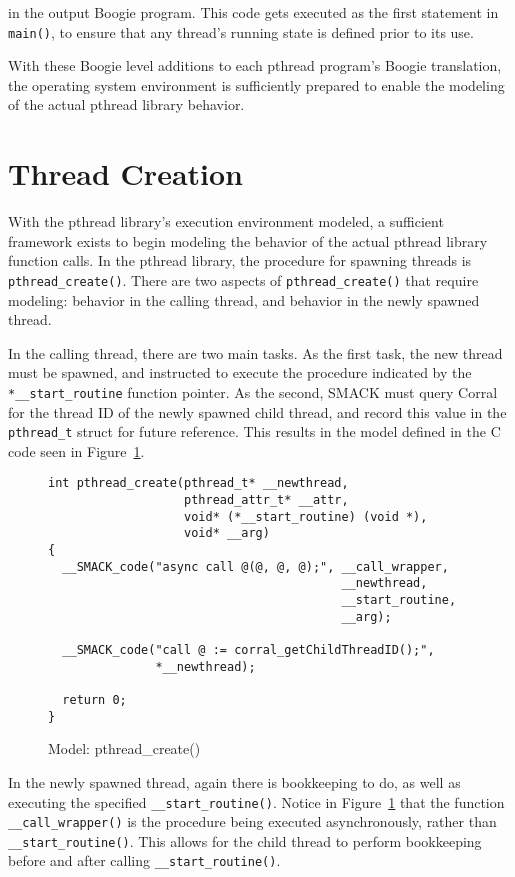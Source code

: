 \noindent in the output Boogie program.  This code gets executed as
the first statement in \lstinline|main()|, to ensure that any thread's
running state is defined prior to its use. 

With these Boogie level additions to each pthread program's Boogie
translation, the operating system environment is sufficiently prepared
to enable the modeling of the actual pthread library behavior.


\section{Thread Creation}
With the pthread library's execution environment modeled, a sufficient
framework exists to begin modeling the behavior of the actual pthread
library function calls.  In the pthread library, the procedure for
spawning threads is \lstinline|pthread_create()|.  There are two
aspects of \lstinline|pthread_create()| that require modeling:
behavior in the calling thread, and behavior in the newly spawned
thread. 

In the calling thread, there are two main tasks.  As the first task,
the new thread must be spawned, and instructed to execute the
procedure indicated by the \lstinline|*__start_routine| function
pointer.  As the second, SMACK must query Corral for the thread ID of
the newly spawned child thread, and record this value in the
\lstinline|pthread_t| struct for future reference.  This results in
the model defined in the C code seen in Figure~\ref{fig:pthread_create}.

\begin{figure}[h]
\centering
\caption{Model: pthread\_create()}\label{fig:pthread_create}
\begin{lstlisting}
int pthread_create(pthread_t* __newthread,
                   pthread_attr_t* __attr,
                   void* (*__start_routine) (void *),
                   void* __arg)
{
  __SMACK_code("async call @(@, @, @);", __call_wrapper,
                                         __newthread,
                                         __start_routine,
                                         __arg);

  __SMACK_code("call @ := corral_getChildThreadID();",
               *__newthread);

  return 0;
}
\end{lstlisting}
\end{figure}

In the newly spawned thread, again there is bookkeeping to do, as well
as executing the specified \lstinline|__start_routine()|.  Notice in
Figure~\ref{fig:pthread_create} that the function
\lstinline|__call_wrapper()| is the procedure being executed
asynchronously, rather than \lstinline|__start_routine()|.  This
allows for the child thread to perform bookkeeping before and after
calling \lstinline|__start_routine()|.

